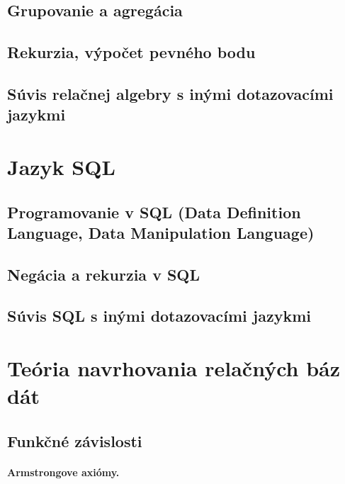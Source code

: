 \documentclass[10pt,a4paper]{article}
\begin{document}
\subsection{Grupovanie a agregácia}
\subsection{Rekurzia, výpočet pevného bodu}
\subsection{Súvis relačnej algebry s inými dotazovacími jazykmi}
    
\section{Jazyk SQL} 
\subsection{Programovanie v SQL (Data Definition Language, Data Manipulation Language)}
\subsection{Negácia a rekurzia v SQL}
\subsection{Súvis SQL s inými dotazovacími jazykmi}
    
\section{Teória navrhovania relačných báz dát} 

\subsection{Funkčné závislosti}
\paragraph{Armstrongove axiómy.} 
\end{document}
